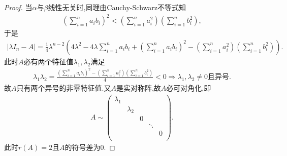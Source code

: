 \documentclass[../../main.tex]{subfiles}%
\begin{document}
\begin{proof}
当$\alpha$与$\beta$线性无关时,同理由Cauchy-Schwarz不等式知
\begin{align*}
\left( \sum\limits_{i=1}^n{a_ib_i} \right) ^2<\left( \sum\limits_{i=1}^n{a_{i}^{2}} \right) \left( \sum\limits_{i=1}^n{b_{i}^{2}} \right),
\end{align*}
于是
\begin{align*}
| \lambda I_n-A |=\frac{1}{4}\lambda ^{n-2}\left( 4\lambda ^2-4\lambda \sum\limits_{i=1}^n{a_ib_i}+\left( \sum\limits_{i=1}^n{a_ib_i} \right) ^2-\left( \sum\limits_{i=1}^n{a_{i}^{2}} \right) \left( \sum\limits_{i=1}^n{b_{i}^{2}} \right) \right).
\end{align*}
此时$A$必有两个特征值$\lambda _1,\lambda _2$满足
\begin{align*}
\lambda _1\lambda _2=\frac{\left( \sum\limits_{i=1}^n{a_ib_i} \right) ^2-\left( \sum\limits_{i=1}^n{a_{i}^{2}} \right) \left( \sum\limits_{i=1}^n{b_{i}^{2}} \right)}{4}<0\Longrightarrow \lambda _1,\lambda _2\ne 0\text{且异号}.
\end{align*}
故$A$只有两个异号的非零特征值.又$A$是实对称阵,故$A$必可对角化,即
\begin{align*}
A\sim \begin{pmatrix}
\lambda _1&		&		&		&		\\
&		\lambda _2&		&		&		\\
&		&		0&		&		\\
&		&		&		\ddots&		\\
&		&		&		&		0\\
\end{pmatrix}.
\end{align*}
此时$r( A ) =2$且$A$的符号差为$0.$
\end{proof}
\end{document}
